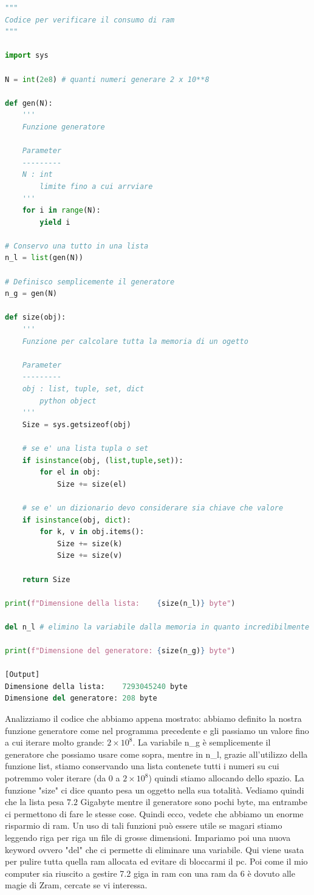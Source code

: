 \documentclass[10pt,a4paper]{article}
\begin{document}
\begin{lstlisting}[language=Python]
"""
Codice per verificare il consumo di ram
"""

import sys

N = int(2e8) # quanti numeri generare 2 x 10**8

def gen(N):
    '''
    Funzione generatore

    Parameter
    ---------
    N : int
        limite fino a cui arrviare
    '''
    for i in range(N):
        yield i

# Conservo una tutto in una lista
n_l = list(gen(N))

# Definisco semplicemente il generatore
n_g = gen(N)

def size(obj):
    '''
    Funzione per calcolare tutta la memoria di un ogetto

    Parameter
    ---------
    obj : list, tuple, set, dict
        python object
    '''
    Size = sys.getsizeof(obj)

    # se e' una lista tupla o set
    if isinstance(obj, (list,tuple,set)):
        for el in obj:
            Size += size(el)

    # se e' un dizionario devo considerare sia chiave che valore
    if isinstance(obj, dict):
        for k, v in obj.items():
            Size += size(k)
            Size += size(v)

    return Size

print(f"Dimensione della lista:    {size(n_l)} byte")

del n_l # elimino la variabile dalla memoria in quanto incredibilmente pesante

print(f"Dimensione del generatore: {size(n_g)} byte")

[Output]
Dimensione della lista:    7293045240 byte
Dimensione del generatore: 208 byte
\end{lstlisting}
Analizziamo il codice che abbiamo appena mostrato: abbiamo definito la nostra funzione generatore come nel programma precedente e gli passiamo un valore fino a cui iterare molto grande: $2 \times 10^8$.
La variabile n\_g è semplicemente il generatore che possiamo usare come sopra, mentre in n\_l, grazie all'utilizzo della funzione list, stiamo conservando una lista contenete tutti i numeri su cui potremmo voler iterare (da 0 a $2 \times 10^8$) quindi stiamo allocando dello spazio.
La funzione "size" ci dice quanto pesa un oggetto nella sua totalità. Vediamo quindi che la lista pesa $7.2$ Gigabyte mentre il generatore sono pochi byte, ma entrambe ci permettono di fare le stesse cose. Quindi ecco, vedete che abbiamo un enorme risparmio di ram. Un uso di tali funzioni può essere utile se magari stiamo leggendo riga per riga un file di grosse dimensioni. Impariamo poi una nuova keyword ovvero "del" che ci permette di eliminare una variabile. Qui viene usata per pulire tutta quella ram allocata ed evitare di bloccarmi il pc.
Poi come il mio computer sia riuscito a gestire 7.2 giga in ram con una ram da 6 è dovuto alle magie di Zram, cercate se vi interessa.
\end{document}
